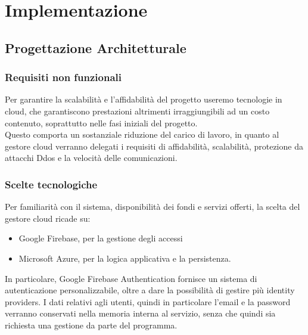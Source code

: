 \clearpage
\section{Implementazione}

\subsection{Progettazione Architetturale}

\subsubsection{Requisiti non funzionali}
Per garantire la scalabilità e l'affidabilità del progetto useremo tecnologie in cloud,
 che garantiscono prestazioni altrimenti irraggiungibili ad un costo contenuto, soprattutto nelle fasi iniziali del progetto.\\
Questo comporta un sostanziale riduzione del carico di lavoro, in quanto al gestore cloud verranno delegati i requisiti di 
affidabilità, scalabilità, protezione da attacchi Ddos e la velocità delle comunicazioni.\\ 
\subsubsection{Scelte tecnologiche}

Per familiarità con il sistema, disponibilità dei fondi e servizi offerti, 
la scelta del gestore cloud ricade su:
\begin{itemize}
    \item Google Firebase, per la gestione degli accessi
    \item Microsoft Azure, per la logica applicativa e la persistenza.
\end{itemize}
In particolare, Google Firebase Authentication fornisce un sistema di autenticazione personalizzabile, 
oltre a dare la possibilità di gestire più identity providers. 
I dati relativi agli utenti, quindi in particolare l'email e la password verranno conservati nella memoria interna al servizio, senza che quindi sia richiesta una gestione da parte del programma.\\

